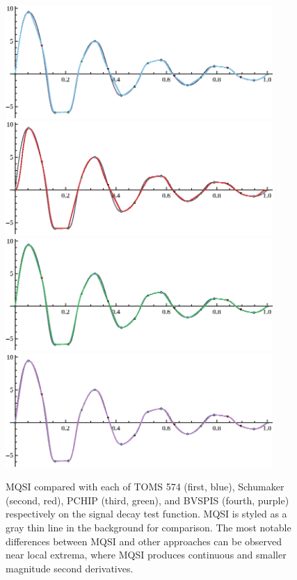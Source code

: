 \begin{figure}
  \centering
\includegraphics[width=4in]{vis/comparisons/signal-decay/1-toms574.eps}
\includegraphics[width=4in]{vis/comparisons/signal-decay/2-schumaker.eps}
\includegraphics[width=4in]{vis/comparisons/signal-decay/3-pchip.eps}
\includegraphics[width=4in]{vis/comparisons/signal-decay/4-bvspis.eps}
\caption{ %
{\ttVIII MQSI} compared with each of TOMS 574 (first, blue), Schumaker
(second, red), {\ttVIII PCHIP} (third, green), and {\ttVIII BVSPIS}
(fourth, purple) respectively on the {\itVIII signal decay} test
function. {\ttVIII MQSI} is styled as a gray thin line in the
background for comparison. The most notable differences between
{\ttVIII MQSI} and other approaches can be observed near local
extrema, where {\ttVIII MQSI} produces continuous and smaller
magnitude second derivatives.}
\end{figure}

